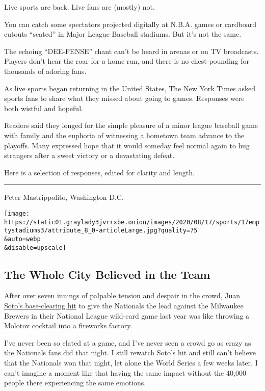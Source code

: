 Live sports are back. Live fans are (mostly) not.

You can catch some spectators projected digitally at N.B.A. games or
cardboard cutouts ``seated'' in Major League Baseball stadiums. But it's
not the same.

The echoing ``DEE-FENSE'' chant can't be heard in arenas or on TV
broadcasts. Players don't hear the roar for a home run, and there is no
chest-pounding for thousands of adoring fans.

As live sports began returning in the United States, The New York Times
asked sports fans to share what they missed about going to games.
Responses were both wistful and hopeful.

Readers said they longed for the simple pleasure of a minor league
baseball game with family and the euphoria of witnessing a hometown team
advance to the playoffs. Many expressed hope that it would someday feel
normal again to hug strangers after a sweet victory or a devastating
defeat.

Here is a selection of responses, edited for clarity and length.

\begin{center}\rule{0.5\linewidth}{\linethickness}\end{center}

Peter Mastrippolito, Washington D.C.

\texttt{[image: https://static01.graylady3jvrrxbe.onion/images/2020/08/17/sports/17emptystadiums3/attribute\_8\_0-articleLarge.jpg?quality=75\\\&auto=webp\\\&disable=upscale]}

\hypertarget{the-whole-city-believed-in-the-team}{%
\subsection{The Whole City Believed in the
Team}\label{the-whole-city-believed-in-the-team}}

After over seven innings of palpable tension and despair in the crowd,
\href{https://www.mlb.com/video/soto-s-hit-clears-bases-for-lead}{Juan
Soto's base-clearing hit} to give the Nationals the lead against the
Milwaukee Brewers in their National League wild-card game last year was
like throwing a Molotov cocktail into a fireworks factory.

I've never been so elated at a game, and I've never seen a crowd go as
crazy as the Nationals fans did that night. I still rewatch Soto's hit
and still can't believe that the Nationals won that night, let alone the
World Series a few weeks later. I can't imagine a moment like that
having the same impact without the 40,000 people there experiencing the
same emotions.

